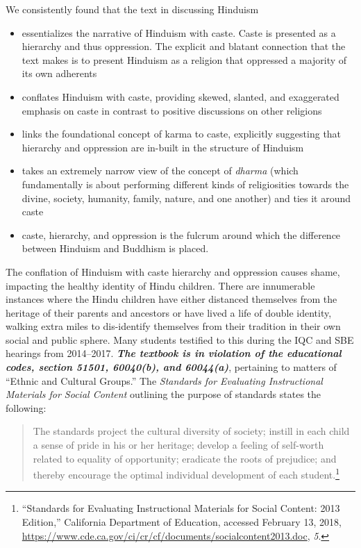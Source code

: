 We consistently found that the text in discussing Hinduism
\begin{itemize} 
\item essentializes the narrative of Hinduism with caste. Caste is presented as a hierarchy and thus oppression. The explicit and blatant connection that the text makes is to present Hinduism as a religion that oppressed a majority of its own adherents 
\item conflates Hinduism with caste, providing skewed, slanted, and exaggerated emphasis on caste in contrast to positive discussions on other religions
\item links the foundational concept of karma to caste, explicitly suggesting that hierarchy and oppression are in-built in the structure of Hinduism
\item takes an extremely narrow view of the concept of \textit{dharma} (which fundamentally is about performing different kinds of religiosities towards the divine, society, humanity, family, nature, and one another) and ties it around caste
\item caste, hierarchy, and oppression is the fulcrum around which the difference between Hinduism and Buddhism is placed. 
\end{itemize}
The conflation of Hinduism with caste hierarchy and oppression causes shame, impacting the healthy identity of Hindu children. There are innumerable instances where the Hindu children have either distanced themselves from the heritage of their parents and ancestors or have lived a life of double identity, walking extra miles to dis-identify themselves from their tradition in their own social and public sphere. Many students testified to this during the IQC and SBE hearings from 2014--2017. \textit{\textbf{The textbook is in violation of the educational codes, section 51501, 60040(b), and 60044(a)}}, pertaining to matters of “Ethnic and Cultural Groups.” The \textit{Standards for Evaluating Instructional Materials for Social Content} outlining the purpose of standards states the following: 
\begin{quote}
The standards project the cultural diversity of society; instill in each child a sense of pride in his or her heritage; develop a feeling of self-worth related to equality of opportunity; eradicate the roots of prejudice; and thereby encourage the optimal individual development of each student.\footnote{“Standards for Evaluating Instructional Materials for Social Content: 2013 Edition,” California Department of Education, accessed February 13, 2018, \url{https://www.cde.ca.gov/ci/cr/cf/documents/socialcontent2013.doc}, \textit{5}.}
\end{quote}
